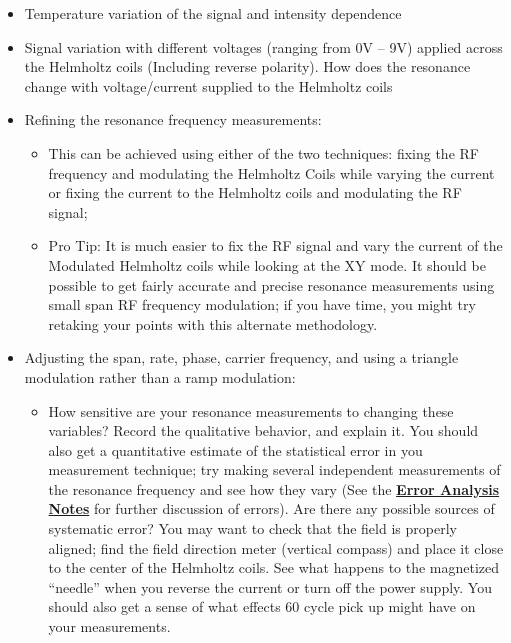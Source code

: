 \documentclass{../lab}
\begin{document}
\begin{itemize}
    \item Temperature variation of the signal and intensity dependence

    \item Signal variation with different voltages (ranging from 0V -- 9V) applied across the Helmholtz coils (Including reverse polarity). How does the resonance change with voltage/current supplied to the Helmholtz coils

    \item Refining the resonance frequency measurements:
    \begin{itemize}
        \item This can be achieved using either of the two techniques: fixing the RF frequency and modulating the Helmholtz Coils while varying the current or fixing the current to the Helmholtz coils and modulating the RF signal;

        \item Pro Tip: It is much easier to fix the RF signal and vary the current of the Modulated Helmholtz coils while looking at the XY mode. It should be possible to get fairly accurate and precise resonance measurements using small span RF frequency modulation; if you have time, you might try retaking your points with this alternate methodology.
    \end{itemize}
    \item Adjusting the span, rate, phase, carrier frequency, and using a triangle modulation rather than a ramp modulation:
    \begin{itemize}
        \item How sensitive are your resonance measurements to changing these variables? Record the qualitative behavior, and explain it. You should also get a quantitative estimate of the statistical error in you measurement technique; try making several independent measurements of the resonance frequency and see how they vary (See the \href{\ErrorAnalysisNotes}{\textbf{Error Analysis Notes}} for further discussion of errors). Are there any possible sources of systematic error? You may want to check that the field is properly aligned; find the field direction meter (vertical compass) and place it close to the center of the Helmholtz coils. See what happens to the magnetized ``needle'' when you reverse the current or turn off the power supply. You should also get a sense of what effects 60 cycle pick up might have on your measurements.


\end{itemize}
\end{itemize}
\end{document}
